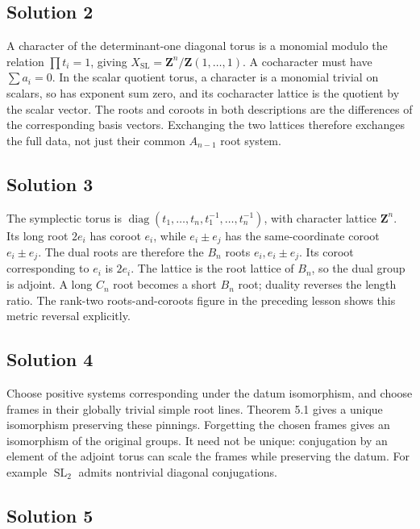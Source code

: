 \documentclass[11pt,a4paper,openany]{report}
\begin{document}
\subsection{Solution 2}\label{AG-RG-05-solution-2}

A character of the determinant-one diagonal torus is a monomial modulo the relation \(\prod t_i=1\), giving \(X_{\mathrm{SL}}=\mathbf Z^n/\mathbf Z(1,\ldots,1)\). A cocharacter must have \(\sum a_i=0\). In the scalar quotient torus, a character is a monomial trivial on scalars, so has exponent sum zero, and its cocharacter lattice is the quotient by the scalar vector. The roots and coroots in both descriptions are the differences of the corresponding basis vectors. Exchanging the two lattices therefore exchanges the full data, not just their common \(A_{n-1}\) root system.

\subsection{Solution 3}\label{AG-RG-05-solution-3}

The symplectic torus is \(\operatorname{diag}(t_1,\ldots,t_n,t_1^{-1},\ldots,t_n^{-1})\), with character lattice \(\mathbf Z^n\). Its long root \(2e_i\) has coroot \(e_i\), while \(e_i\pm e_j\) has the same-coordinate coroot \(e_i\pm e_j\). The dual roots are therefore the \(B_n\) roots \(e_i,e_i\pm e_j\). Its coroot corresponding to \(e_i\) is \(2e_i\). The lattice is the root lattice of \(B_n\), so the dual group is adjoint. A long \(C_n\) root becomes a short \(B_n\) root; duality reverses the length ratio. The rank-two roots-and-coroots figure in the preceding lesson shows this metric reversal explicitly.

\subsection{Solution 4}\label{AG-RG-05-solution-4}

Choose positive systems corresponding under the datum isomorphism, and choose frames in their globally trivial simple root lines. Theorem 5.1 gives a unique isomorphism preserving these pinnings. Forgetting the chosen frames gives an isomorphism of the original groups. It need not be unique: conjugation by an element of the adjoint torus can scale the frames while preserving the datum. For example \(\operatorname{SL}_2\) admits nontrivial diagonal conjugations.

\subsection{Solution 5}\label{AG-RG-05-solution-5}
\end{document}
